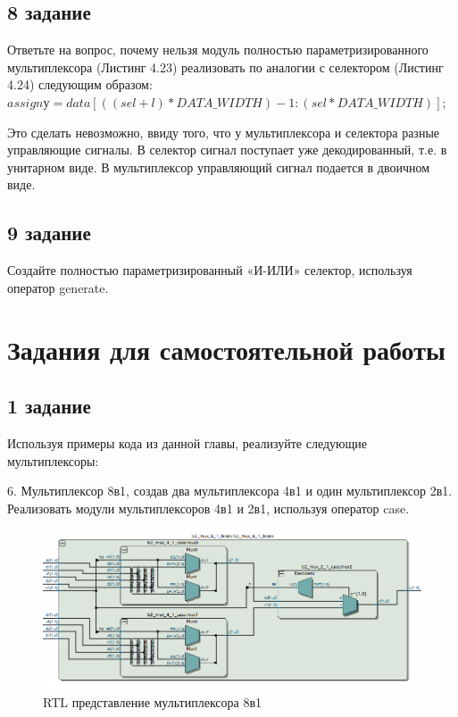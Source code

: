 \documentclass[a4paper,14pt]{article}
\begin{document}
\subsection{8 задание}

Ответьте на вопрос, почему нельзя модуль полностью параметризированного мультиплексора (Листинг 4.23) реализовать по аналогии с селектором (Листинг 4.24) следующим образом: $assign у= data[((sel+l)*DATA\_WIDTH) - 1: (sel*DATA\_WIDTH)]$;

Это сделать невозможно, ввиду того, что у мультиплексора и селектора разные управляющие сигналы. В селектор сигнал поступает уже декодированный, т.е. в унитарном виде. В мультиплексор управляющий сигнал подается в двоичном виде.

\subsection{9 задание}

Создайте полностью параметризированный «И-ИЛИ» селектор, используя оператор generate.

\section{Задания для самостоятельной работы}

\subsection{1 задание}

Используя примеры кода из данной главы, реализуйте следующие
мультиплексоры:

6. Мультиплексор 8в1, создав два мультиплексора 4в1 и один мультиплексор 2в1.
Реализовать модули мультиплексоров 4в1 и 2в1, используя оператор case.




\begin{figure}[H]
	\centering
	\includegraphics[width=0.6\linewidth]{img/dop1_rtl}
	\caption{RTL представление мультиплексора 8в1}
	\label{fig:dop1_rtl}
\end{figure}
\end{document}
